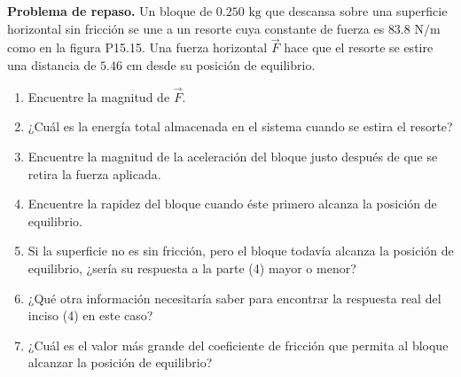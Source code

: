 \item \textbf{Problema de repaso.}
Un bloque de $0.250\text{ kg}$ que descansa sobre una superficie horizontal sin fricción se une a un resorte cuya constante de fuerza es $83.8\text{ N/m}$ como en la figura P15.15. Una fuerza horizontal $\vec{F}$ hace que el resorte se estire una distancia de $5.46\text{ cm}$ desde su posición de equilibrio.
\begin{enumerate}
    \item Encuentre la magnitud de $\vec{F}$.
    \item ¿Cuál es la energía total almacenada en el sistema cuando se estira el resorte?
    \item Encuentre la magnitud de la aceleración del bloque justo después de que se retira la fuerza aplicada.
    \item Encuentre la rapidez del bloque cuando éste primero alcanza la posición de equilibrio.
    \item Si la superficie no es sin fricción, pero el bloque todavía alcanza la posición de equilibrio, ¿sería su respuesta a la parte (4) mayor o menor?
    \item ¿Qué otra información necesitaría saber para encontrar la respuesta real del inciso (4) en este caso?
    \item ¿Cuál es el valor más grande del coeficiente de fricción que permita al bloque alcanzar la posición de equilibrio?
\end{enumerate}